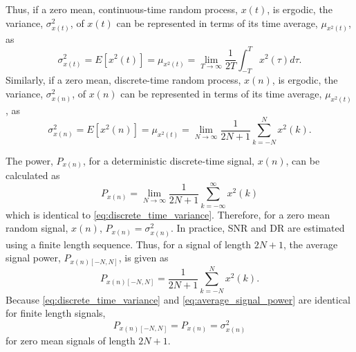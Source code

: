 Thus, if a zero mean, continuous-time  random process, $x(t)$, is ergodic, the variance,
$\sigma_{x(t)}^2$, of $x(t)$ can be represented in terms of its time average,
$\mu_{x^2(t)}$, as
\begin{equation}\label{eq:cont_time_variance}
\sigma_{x(t)}^2=E\left[x^2(t)\right]=\mu_{x^2(t)}=\lim_{T \to \infty}
\frac{1}{2T}\int_{-T}^{T}{x^2(\tau)d\tau}\text{.}
\end{equation}
Similarly, if a zero mean, discrete-time random process, $x(n)$, is ergodic, the variance,
$\sigma^2_{x(n)}$, of $x(n)$ can be represented in terms of its time average,
$\mu_{x^2(t)}$, as
\begin{equation}\label{eq:discrete_time_variance}
\sigma^2_{x(n)}=E\left[x^2(n)\right]=\mu_{x^2(t)}=\lim_{N \to \infty}
\frac{1}{2N+1}\sum_{k=-N}^{N}{x^2(k)}\text{.}
\end{equation}

The power, $P_{x(n)}$, for a deterministic discrete-time signal, $x(n)$, can be calculated
as
\begin{equation}\label{eq:signal_power}
P_{x(n)} =\lim_{N \to
\infty}\frac{1}{2N+1}\sum_{k=-\infty}^{\infty}{x^2(k)}
\end{equation}
which is identical to \eqref{eq:discrete_time_variance}. Therefore, for a zero mean
random signal, $x(n)$, $P_{x(n)}=\sigma^2_{x(n)}$. In practice, SNR and DR are estimated
using
a finite length sequence. Thus, for a signal of length $2N+1$, the average signal
power, $P_{x(n)[-N,N]}$, is
given as
\begin{equation}\label{eq:average_signal_power}
 P_{x(n)[-N,N]} =\frac{1}{2N+1}\sum_{k=-N}^{N}{x^2(k)}\text{.}
\end{equation}
Because \eqref{eq:discrete_time_variance} and \eqref{eq:average_signal_power} are
identical for finite length signals, $$P_{x(n)[-N,N]}=P_{x(n)}=\sigma^2_{x(n)}$$ for zero
mean signals of length $2N+1$.

